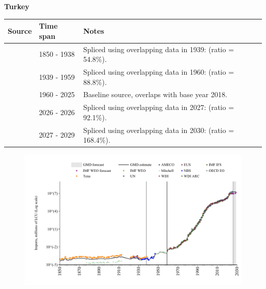\documentclass[12pt,a4paper,landscape]{article}
\begin{document}
\begin{adjustbox}{max totalsize={\paperwidth}{\paperheight},center}
\begin{minipage}[t][\textheight][t]{\textwidth}
\vspace*{0.5cm}
{}
\begin{center}
{\Large\bfseries Turkey}
\end{center}
\vspace{0.5cm}
\begin{table}[H]
\centering
\small
\begin{tabular}{|l|l|l|}
\hline
\textbf{Source} & \textbf{Time span} & \textbf{Notes} \\
\hline
\rowcolor{white}\cite{Tena}& 1850 - 1938 &Spliced using overlapping data in 1939: (ratio = 54.8\%).\\
\rowcolor{lightgray}\cite{Mitchell}& 1939 - 1959 &Spliced using overlapping data in 1960: (ratio = 88.8\%).\\
\rowcolor{white}\cite{OECD_EO}& 1960 - 2025 &Baseline source, overlaps with base year 2018.\\
\rowcolor{lightgray}\cite{AMECO}& 2026 - 2026 &Spliced using overlapping data in 2027: (ratio = 92.1\%).\\
\rowcolor{white}\cite{IMF_WEO_forecast}& 2027 - 2029 &Spliced using overlapping data in 2030: (ratio = 168.4\%).\\
\hline
\end{tabular}
\end{table}
\begin{figure}[H]
\centering
\includegraphics[width=\textwidth,height=0.6\textheight,keepaspectratio]{graphs/TUR_imports.pdf}
\end{figure}
\end{minipage}
\end{adjustbox}
\end{document}
